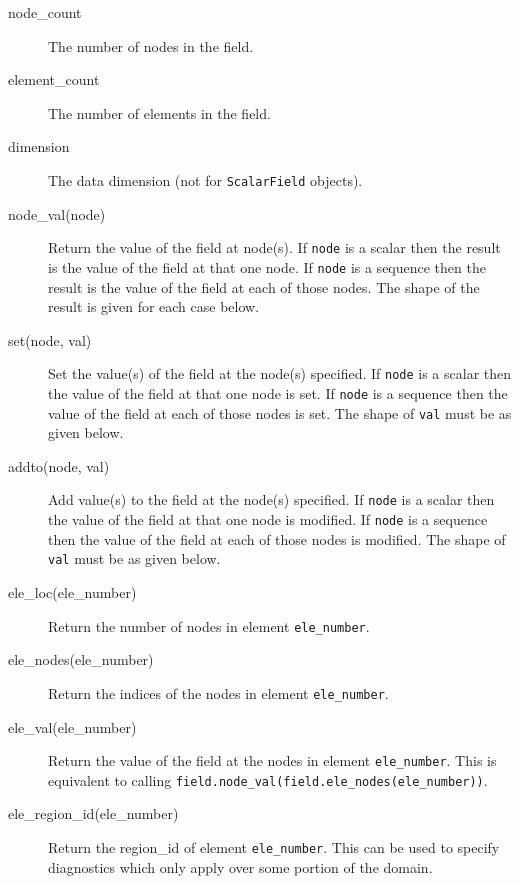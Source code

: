 \begin{description}
\item[node\_count] The number of nodes in the field.
\item[element\_count] The number of elements in the field.
\item[dimension] The data dimension (not for
  \lstinline[language=Python]+ScalarField+ objects).
\item[node\_val(node)] Return the value of the field at node(s). If
  \lstinline[language=Python]+node+ is a scalar then the result is the value
  of the field at that one node. If \lstinline[language=Python]+node+ is a
  sequence then the result is the value of the field at each of those
  nodes. The shape of the result is given for each case below.
\item[set(node, val)] Set the value(s) of the field at the node(s) specified. If
  \lstinline[language=Python]+node+ is a scalar then the value
  of the field at that one node is set. If \lstinline[language=Python]+node+ is a
  sequence then the value of the field at each of those nodes is set. The
  shape of \lstinline[language=Python]+val+ must be as given below.
\item[addto(node, val)] Add value(s) to the field at the node(s) specified.
  If \lstinline[language=Python]+node+ is a scalar then the value of the
  field at that one node is modified. If \lstinline[language=Python]+node+
  is a sequence then the value of the field at each of those nodes is
  modified. The shape of \lstinline[language=Python]+val+ must be as given
  below.
\item[ele\_loc(ele\_number)] Return the number of nodes in element
  \lstinline[language=Python]+ele_number+.
\item[ele\_nodes(ele\_number)] Return the indices of the nodes in element
  \lstinline[language=Python]+ele_number+.
\item[ele\_val(ele\_number)] Return the value of the field at the nodes in element
  \lstinline[language=Python]+ele_number+. This is equivalent to calling
  \lstinline[language=Python]+field.node_val(field.ele_nodes(ele_number))+.
\item[ele\_region\_id(ele\_number)] Return the region\_id of element
  \lstinline[language=Python]+ele_number+. This can be used to specify
  diagnostics which only apply over some portion of the domain.
\end{description}

